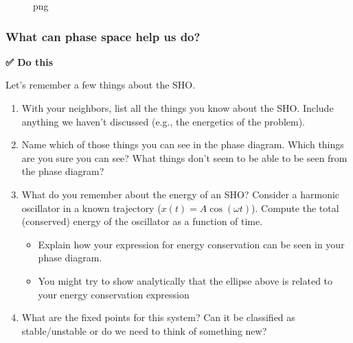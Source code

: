 \begin{figure}
\centering
{}
\caption{png}
\end{figure}

\subsubsection{What can phase space help us
do?}\label{what-can-phase-space-help-us-do}

\textbf{✅ Do this}

Let's remember a few things about the SHO.

\begin{enumerate}
\def\labelenumi{\arabic{enumi}.}
\tightlist
\item
  With your neighbors, list all the things you know about the SHO.
  Include anything we haven't discussed (e.g., the energetics of the
  problem).
\item
  Name which of those things you can see in the phase diagram. Which
  things are you sure you can see? What things don't seem to be able to
  be seen from the phase diagram?
\item
  What do you remember about the energy of an SHO? Consider a harmonic
  oscillator in a known trajectory (\(x(t) = A\cos(\omega t)\)). Compute
  the total (conserved) energy of the oscillator as a function of time.

  \begin{itemize}
  \tightlist
  \item
    Explain how your expression for energy conservation can be seen in
    your phase diagram.
  \item
    You might try to show analytically that the ellipse above is related
    to your energy conservation expression
  \end{itemize}
\item
  What are the fixed points for this system? Can it be classified as
  stable/unstable or do we need to think of something new?
\end{enumerate}


